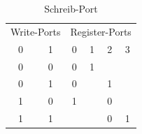 \begin{table}[htbp]
	
	\begin{minipage}{.5\textwidth}
		\flushleft
		\begin{tabular}{cccccc}
			\multicolumn{2}{l}{Write-Ports}                 & \multicolumn{4}{|l}{Register-Ports}                                                               \\ 
			\multicolumn{1}{c}{0} & \multicolumn{1}{c}{1} & \multicolumn{1}{|c}{0} & \multicolumn{1}{c}{1} & \multicolumn{1}{c}{2} & \multicolumn{1}{c}{3} \\ 
			\hline
			\multicolumn{1}{c}{0} & \multicolumn{1}{c}{0} & \multicolumn{1}{|c}{0} & \multicolumn{1}{c}{1} & \multicolumn{1}{c}{} & \multicolumn{1}{c}{} \\ 
			\multicolumn{1}{c}{0} & \multicolumn{1}{c}{1} & \multicolumn{1}{|c}{0} & \multicolumn{1}{c}{} & \multicolumn{1}{c}{1} & \multicolumn{1}{c}{} \\ 
			\multicolumn{1}{c}{1} & \multicolumn{1}{c}{0} & \multicolumn{1}{|c}{1} & \multicolumn{1}{c}{} & \multicolumn{1}{c}{0} & \multicolumn{1}{c}{} \\ 
			\multicolumn{1}{c}{1} & \multicolumn{1}{c}{1} & \multicolumn{1}{|c}{} & \multicolumn{1}{c}{} & \multicolumn{1}{c}{0} &  \multicolumn{1}{c}{1}                   
		\end{tabular}
		\caption{\label{fig::schreib-port}Schreib-Port}
	\end{minipage}
	\hfill
	\begin{minipage}{.5\textwidth}
		\flushleft
		

\end{minipage}
\end{table}
